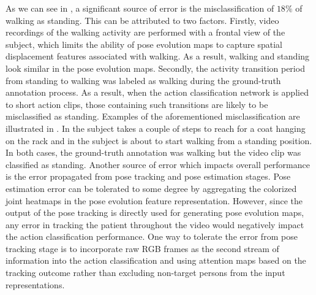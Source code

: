  \missclass
 As we can see in , a significant source of error is the misclassification of $18\%$ of walking as standing. This can be attributed to two factors. Firstly, video recordings of the walking activity are performed with a frontal view of the subject, which limits the ability of pose evolution maps to capture spatial displacement features associated with walking. As a result, walking and standing look similar in the pose evolution maps. Secondly, the activity transition period from standing to walking was labeled as walking during the ground-truth annotation process. As a result, when the action classification network is applied to short action clips, those containing such transitions are likely to be misclassified as standing. Examples of the aforementioned misclassification are illustrated in . In  the subject takes a couple of steps to reach for a coat hanging on the rack and in  the subject is about to start walking from a standing position. In both cases, the ground-truth annotation was walking but the video clip was classified as standing.
 Another source of error which impacts overall performance is the error propagated from pose tracking and pose estimation stages. Pose estimation error can be tolerated to some degree by aggregating the colorized joint heatmaps in the pose evolution feature representation. However, since the output of the pose tracking is directly used for generating pose evolution maps, any error in tracking the patient throughout the video would negatively impact the action classification performance. One way to tolerate the error from pose tracking stage is to incorporate raw RGB frames as the second stream of information into the action classification and using attention maps based on the tracking outcome rather than excluding non-target persons from the input representations.  